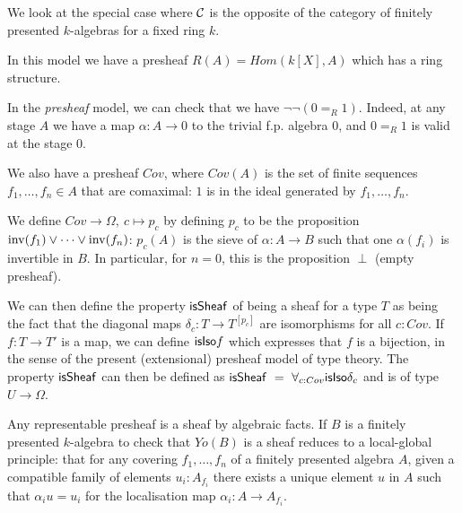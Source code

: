 \medskip

We look at the special case where $\mathcal{C}$ is the opposite of the category of finitely presented $k$-algebras for a fixed
ring $k$.

    In this model we have a presheaf $R(A) = Hom(k[X],A)$ which has a ring structure.

    In the {\em presheaf} model, we can check that we have $\neg\neg (0=_R 1)$. Indeed, at any stage $A$ we have
    a map $\alpha:A\rightarrow 0$ to the trivial f.p. algebra $0$, and $0 =_R 1$ is valid at the stage $0$.

    \medskip

    
    We also have a presheaf $Cov$, where $Cov(A)$ is the set of finite sequences $f_1,\dots,f_n\in A$ that are comaximal: $1$ is in the
    ideal generated by $f_1,\dots,f_n$.

    We define $Cov\rightarrow\Omega,~c\mapsto p_c$ by defining $p_c$ to be the proposition $\mathrm{inv}(f_1)\vee\dots\vee\mathrm{inv}(f_n)$: $p_c(A)$
    is the sieve of $\alpha:A\rightarrow B$ such that one $\alpha(f_i)$ is invertible in $B$.
    In particular, for $n=0$, this is the proposition $\perp$ (empty presheaf).

    We can then define the property $\mathsf{isSheaf}$ of being a sheaf for a type $T$ as being the fact that
    the diagonal maps $\delta_c : T\rightarrow T^{[p_c]}$ are isomorphisms for all $c:Cov$.
    If $f:T\rightarrow T'$ is a map, we can define $\mathsf{isIso} f$ which expresses that $f$ is a bijection,
    in the sense of the present (extensional) presheaf model of type theory.
    The property $\mathsf{isSheaf}$ can then be defined as $\mathsf{isSheaf}~=~\forall_{c:Cov}\mathsf{isIso}\delta_c$ and is of type
    $U\rightarrow\Omega$.

    \medskip

    Any representable presheaf is a sheaf by algebraic facts. If $B$ is a finitely presented $k$-algebra
    to check that $Yo(B)$ is a sheaf reduces to a local-global principle: that for any covering $f_1,\dots,f_n$ of a finitely presented
    algebra $A$, given a compatible family of elements $u_i:A_{f_i}$ there exists a unique element $u$ in $A$ such that $\alpha_i u = u_i$
    for the localisation map $\alpha_i:A\rightarrow A_{f_i}$.

